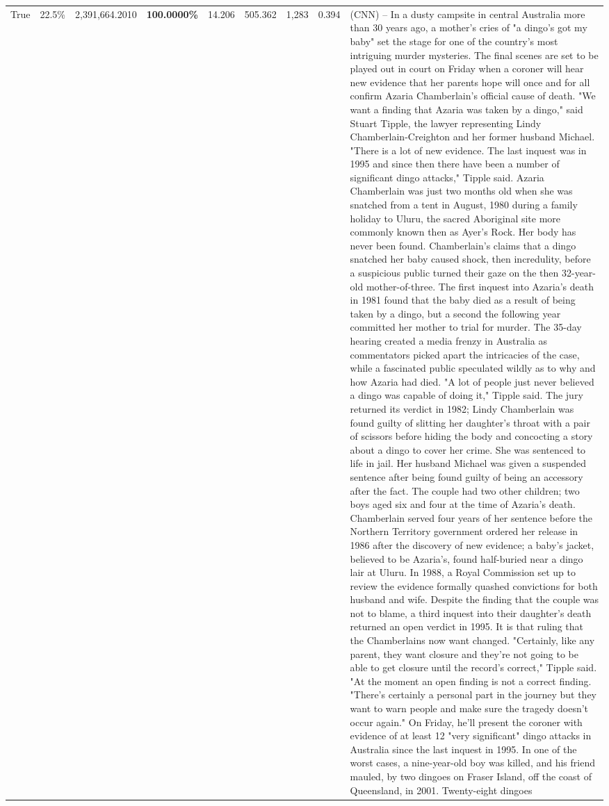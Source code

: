 \begin{table}[H]
\begin{tabular}{lllrlllll}
True & 22.5\% & 2,391,664.2010 & \bfseries \color{red} 100.0000\% & 14.206 & 505.362 & 1,283 & 0.394 & (CNN) -- In a dusty campsite in central Australia more than 30 years ago, a mother's cries of "a dingo's got my baby" set the stage for one of the country's most intriguing murder mysteries. The final scenes are set to be played out in court on Friday when a coroner will hear new evidence that her parents hope will once and for all confirm Azaria Chamberlain's official cause of death. "We want a finding that Azaria was taken by a dingo," said Stuart Tipple, the lawyer representing Lindy Chamberlain-Creighton and her former husband Michael. "There is a lot of new evidence. The last inquest was in 1995 and since then there have been a number of significant dingo attacks," Tipple said. Azaria Chamberlain was just two months old when she was snatched from a tent in August, 1980 during a family holiday to Uluru, the sacred Aboriginal site more commonly known then as Ayer's Rock. Her body has never been found. Chamberlain's claims that a dingo snatched her baby caused shock, then incredulity, before a suspicious public turned their gaze on the then 32-year-old mother-of-three. The first inquest into Azaria's death in 1981 found that the baby died as a result of being taken by a dingo, but a second the following year committed her mother to trial for murder. The 35-day hearing created a media frenzy in Australia as commentators picked apart the intricacies of the case, while a fascinated public speculated wildly as to why and how Azaria had died. "A lot of people just never believed a dingo was capable of doing it," Tipple said. The jury returned its verdict in 1982; Lindy Chamberlain was found guilty of slitting her daughter's throat with a pair of scissors before hiding the body and concocting a story about a dingo to cover her crime. She was sentenced to life in jail. Her husband Michael was given a suspended sentence after being found guilty of being an accessory after the fact. The couple had two other children; two boys aged six and four at the time of Azaria's death. Chamberlain served four years of her sentence before the Northern Territory government ordered her release in 1986 after the discovery of new evidence; a baby's jacket, believed to be Azaria's, found half-buried near a dingo lair at Uluru. In 1988, a Royal Commission set up to review the evidence formally quashed convictions for both husband and wife. Despite the finding that the couple was not to blame, a third inquest into their daughter's death returned an open verdict in 1995. It is that ruling that the Chamberlains now want changed. "Certainly, like any parent, they want closure and they're not going to be able to get closure until the record's correct," Tipple said. "At the moment an open finding is not a correct finding. "There's certainly a personal part in the journey but they want to warn people and make sure the tragedy doesn't occur again." On Friday, he'll present the coroner with evidence of at least 12 "very significant" dingo attacks in Australia since the last inquest in 1995. In one of the worst cases, a nine-year-old boy was killed, and his friend mauled, by two dingoes on Fraser Island, off the coast of Queensland, in 2001. Twenty-eight dingoes 
\end{tabular}
\end{table}
